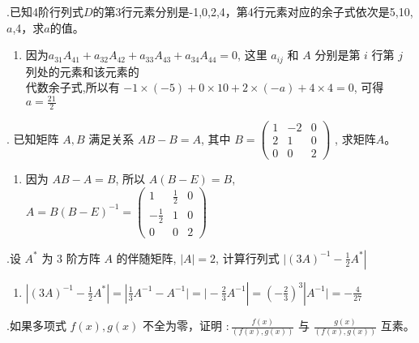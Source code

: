 \documentclass{article}
\begin{document}
\setlength{\parindent}{2em}                       %
{.}已知4阶行列式${D}$的第3行元素分别是-1,0,2,4，第4行元素对应的余子式依次是5,10,$a$,4，求$a$的值。
\begin{enumerate}[\qquad 解：]
    \item 因为$a_{31}A_{41}+a_{32}A_{42}+a_{33}A_{43}+a_{34}A_{44}=0$,
          这里 $a_{i j}$ 和 $A$ 分别是第 ${i}$ 行第 $j$ 列处的元素和该元素的  \\
          代数余子式,所以有 $-1 \times(-5)+0 \times 10+2 \times(-a)+4 \times 4=0$,
          可得 $a=\frac{21}{2}$
\end{enumerate}

\vspace{1ex}
{.} 已知矩阵 $A, B$ 满足关系 $A B-B=A$, 其中 $B=\left(
    \begin{array}{ccc}
            1 & -2 & 0 \\
            2 & 1  & 0 \\
            0 & 0  & 2
        \end{array}
    \right)$
, 求矩阵$A$。
\begin{enumerate}[\qquad 解：]
    \item 因为 ${A B-A=B}$, 所以 $A(B-E)=B$, $A=B(B-E)^{-1}=\left(
              \begin{array}{ccc}
                      1            & \frac{1}{2} & 0 \\
                      -\frac{1}{2} & 1           & 0 \\
                      0            & 0           & 2
                  \end{array}
              \right)$
\end{enumerate}

\vspace{1ex}
{.}设 $A^{*}$ 为 $3$ 阶方阵 $A$ 的伴随矩阵, $|A|=2$, 计算行列式 $|(3 A)^{-1}-\left.\frac{1}{2} A^{*}\right|$
\begin{enumerate}[\qquad 解：]
    \item $|(3 A)^{-1}-\left.\frac{1}{2} A^{*}\right|=|\frac{1}{3}A^{-1}-A^{-1}|=|-\frac{2}{3}A^{-1}|=(-\frac{2}{3})^{3}|A^{-1}|=-\frac{4}{27}$
\end{enumerate}

\vspace{1ex}
{.}如果多项式 $f(x), g(x)$ 不全为零，证明 $: \frac{f(x)}{(f(x), g(x))}$ 与 $\frac{g(x)}{(f(x), g(x))}$ 互素。
\end{document}
